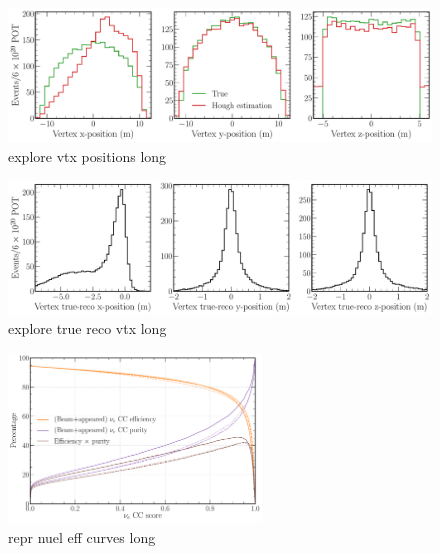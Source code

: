 \begin{figure} %
    \includegraphics[width=\textwidth]{diagrams/7-cvn/chipsnet/explore_vtx_positions.pdf}
    \caption[explore vtx positions short]
    {explore vtx positions long}
    \label{fig:explore_vtx_positions}
\end{figure}

\begin{figure} %
    \includegraphics[width=\textwidth]{diagrams/7-cvn/chipsnet/explore_true_reco_vtx.pdf}
    \caption[explore true reco vtx short]
    {explore true reco vtx long}
    \label{fig:explore_true_reco_vtx}
\end{figure}

\begin{figure} %
    \includegraphics[width=0.6\textwidth]{diagrams/7-cvn/chipsnet/repr_nuel_eff_curves.pdf}
    \caption[repr nuel eff curves short]
    {repr nuel eff curves long}
    \label{fig:repr_nuel_eff_curves}
\end{figure}

